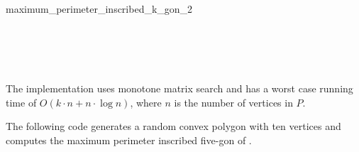 \begin{ccRefFunction}{maximum_perimeter_inscribed_k_gon_2}
  \ccSeeAlso
  \\
  \\
  \\
  \\
  \\
  
  \ccImplementation The implementation uses monotone matrix search
  \cite{akmsw-gamsa-87} and has a worst case running time of $O(k
  \cdot n + n \cdot \log n)$, where $n$ is the number of vertices in
  $P$.

  \ccExample The following code generates a random convex polygon
   with ten vertices and computes the maximum perimeter inscribed
  five-gon of .


\end{ccRefFunction}

